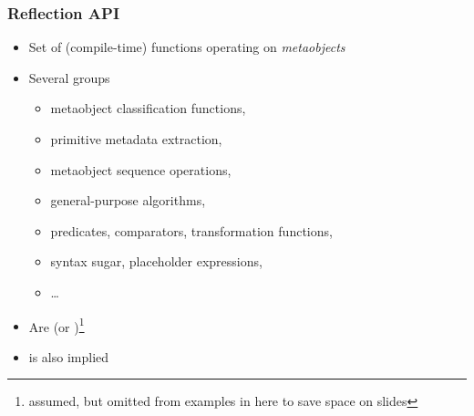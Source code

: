 \documentclass[aspectratio=169,compress,table,xcolor=table]{beamer}
\begin{document}
\begin{frame}
  \frametitle{Reflection API}
  \larger
  \begin{itemize}
    \item Set of (compile-time) functions operating on {\em metaobjects}
    \item Several groups
    \begin{itemize}
      \item metaobject classification functions,
      \item primitive metadata extraction,
      \item metaobject sequence operations,
      \item general-purpose algorithms,
      \item predicates, comparators, transformation functions,
      \item syntax sugar, placeholder expressions,
      \item \ldots
    \end{itemize}
  \item Are  (or )\footnote{
      assumed, but omitted from examples in here to save space on slides}
  \item {} is also implied
  \end{itemize}
\end{frame}
\end{document}
